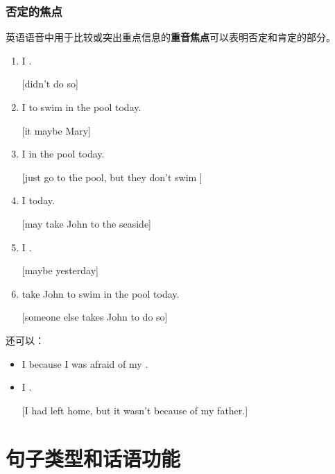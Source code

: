 \subsubsection{否定的焦点}

英语语音中用于比较或突出重点信息的\textbf{重音焦点}可以表明否定和肯定的部分。
\begin{enumerate}
\item I .

  [didn't do so]
\item I  to swim in the pool today.

  [it maybe Mary]
\item I  in the pool today.

  [just go to the pool, but they don't swim ]
\item I  today.

  [may take John to the seaside]
\item I .

  [maybe yesterday]
\item {} take John to swim in the pool today.

  [someone else takes John to do so]
\end{enumerate}

还可以：
\begin{itemize}
\item I  because I was afraid of my .
\item I .

  [I had left home, but it wasn't because of my father.]
\end{itemize}

\section{句子类型和话语功能}

